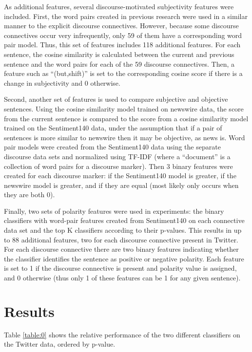 \documentclass[11pt,letterpaper]{article}
\begin{document}
As additional features, several discourse-motivated subjectivity features were included.  First, the word pairs created in previous research \cite{Biran:2013}
were used in a similar manner to the explicit discourse connectives.  However, because some discourse connectives occur very infrequently, only 59
of them have a corresponding word pair model.  Thus, this set of features includes 118 additional features.  For each sentence, the cosine similarity
is calculated between the current and previous sentence and the word pairs for each of the 59 discourse connectives.  Then, a feature such as ``(but,shift)''
is set to the corresponding cosine score if there is a change in subjectivity and 0 otherwise.

Second, another set of features is used to compare subjective and objective sentences.  Using the cosine similarity model trained on newswire data,
the score from the current sentence is compared to the score from a cosine similarity model trained on the Sentiment140 data, under the assumption that
if a pair of sentences is more similar to newswire then it may be objective, as news is.  Word pair models were created from the Sentiment140 data
using the separate discourse data sets and normalized using TF-IDF (where a ``document'' is a collection of word pairs for a discourse marker).  Then
3 binary features were created for each discourse marker: if the Sentiment140 model is greater, if the newswire model is greater, and if they are equal
(most likely only occurs when they are both 0).

Finally, two sets of polarity features were used in experiments: the binary classifiers with word-pair features created from Sentiment140 on each connective data set and the top K
classifiers according to their p-values.  This results in up to 88 additional features, two for each discourse connective present in Twitter.  For each
discourse connective there are two binary features indicating whether the classifier identifies the sentence as positive or negative polarity.
Each feature is set to 1 if the discourse connective is present and polarity value is assigned, and 0 otherwise (thus only 1 of these features can be 1
for any given sentence).

\section{Results}
Table \ref{table:0} shows the relative performance of the two different classifiers on the Twitter data, ordered by p-value.
\end{document}
